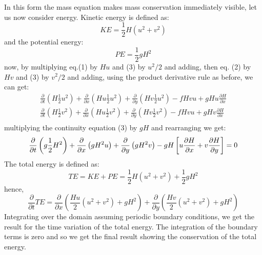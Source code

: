 In this form the mass equation makes mass conservation immediately visible, let us now consider energy.
Kinetic energy is defined as:
$$KE=\frac{1}{2}H(u^2+v^2)$$
and the potential energy:
$$PE=\frac{1}{2}gH^2$$
now, by multiplying eq.(1) by $Hu$ and (3) by $u^2/2$ and adding, then eq. (2) by $Hv$ and (3) by $v^2/2$ and adding, using the product derivative rule as before, we can get: 
\begin{align}
    \frac{\partial}{\partial t}\left(H\frac{1}{2}u^2\right)+\frac{\partial}{\partial x}\left(Hu\frac{1}{2}u^2\right)+\frac{\partial}{\partial y}\left(Hv\frac{1}{2}u^2\right)-fHvu+gHu\frac{\partial H}{\partial x}\\
    \frac{\partial}{\partial t}\left(H\frac{1}{2}v^2\right)+\frac{\partial}{\partial x}\left(Hu\frac{1}{2}v^2\right)+\frac{\partial}{\partial y}\left(Hv\frac{1}{2}v^2\right)-fHvu+gHv\frac{\partial H}{\partial x}\\
\end{align}
multiplying the continuity equation (3) by $gH$ and rearranging we get: 
\begin{equation}
    \frac{\partial}{\partial t}\left(g\frac{1}{2}H^2\right)+\frac{\partial}{\partial x}\left(gH^2u\right)+\frac{\partial}{\partial y}\left(gH^2v\right)-gH\left[u\frac{\partial H}{\partial x}+v\frac{\partial H}{\partial y}\right]=0\\
\end{equation}
The total energy is defined as:
$$TE=KE+PE=\frac{1}{2}H(u^2+v^2)+\frac{1}{2}gH^2$$
hence, 
\begin{equation}
    \frac{\partial}{\partial t}TE=\frac{\partial }{\partial x}\left(\frac{Hu}{2}(u^2+v^2)+gH^2\right)+\frac{\partial}{\partial y}\left(\frac{Hv}{2}(u^2+v^2)+gH^2\right)
\end{equation}
Integrating over the domain assuming periodic boundary conditions, we get the result for the time variation of the total energy. The integration of the boundary terms is zero and so we get the final result showing the conservation of the total energy.
